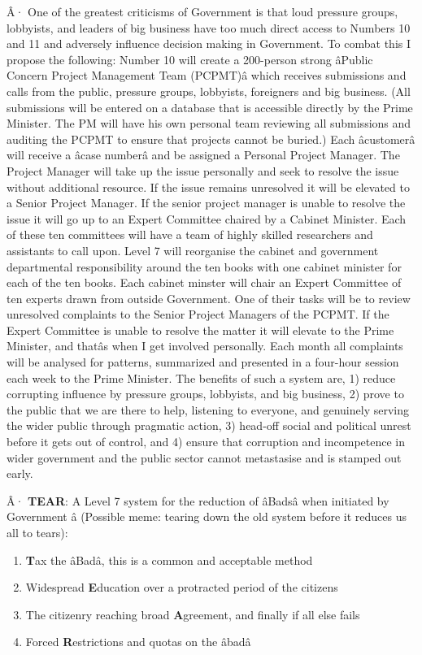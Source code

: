 \documentclass[]{tufte-handout}
\begin{document}
Â· One of the greatest criticisms of Government is that loud pressure
groups, lobbyists, and leaders of big business have too much direct
access to Numbers 10 and 11 and adversely influence decision making in
Government. To combat this I propose the following: Number 10 will
create a 200-person strong âPublic Concern Project Management Team
(PCPMT)â which receives submissions and calls from the public,
pressure groups, lobbyists, foreigners and big business. (All
submissions will be entered on a database that is accessible directly by
the Prime Minister. The PM will have his own personal team reviewing all
submissions and auditing the PCPMT to ensure that projects cannot be
buried.) Each âcustomerâ will receive a âcase numberâ and be
assigned a Personal Project Manager. The Project Manager will take up
the issue personally and seek to resolve the issue without additional
resource. If the issue remains unresolved it will be elevated to a
Senior Project Manager. If the senior project manager is unable to
resolve the issue it will go up to an Expert Committee chaired by a
Cabinet Minister. Each of these ten committees will have a team of
highly skilled researchers and assistants to call upon. Level 7 will
reorganise the cabinet and government departmental responsibility around
the ten books with one cabinet minister for each of the ten books. Each
cabinet minster will chair an Expert Committee of ten experts drawn from
outside Government. One of their tasks will be to review unresolved
complaints to the Senior Project Managers of the PCPMT. If the Expert
Committee is unable to resolve the matter it will elevate to the Prime
Minister, and thatâs when I get involved personally. Each month all
complaints will be analysed for patterns, summarized and presented in a
four-hour session each week to the Prime Minister. The benefits of such
a system are, 1) reduce corrupting influence by pressure groups,
lobbyists, and big business, 2) prove to the public that we are there to
help, listening to everyone, and genuinely serving the wider public
through pragmatic action, 3) head-off social and political unrest before
it gets out of control, and 4) ensure that corruption and incompetence
in wider government and the public sector cannot metastasise and is
stamped out early.

Â· \textbf{TEAR}: A Level 7 system for the reduction of âBadsâ when
initiated by Government â (Possible meme: tearing down the old system
before it reduces us all to tears):

\begin{enumerate}
\def\labelenumi{\arabic{enumi})}
\item
  \textbf{T}ax the âBadâ, this is a common and acceptable method
\item
  Widespread \textbf{E}ducation over a protracted period of the citizens
\item
  The citizenry reaching broad \textbf{A}greement, and finally if all
  else fails
\item
  Forced \textbf{R}estrictions and quotas on the âbadâ
\end{enumerate}
\end{document}
